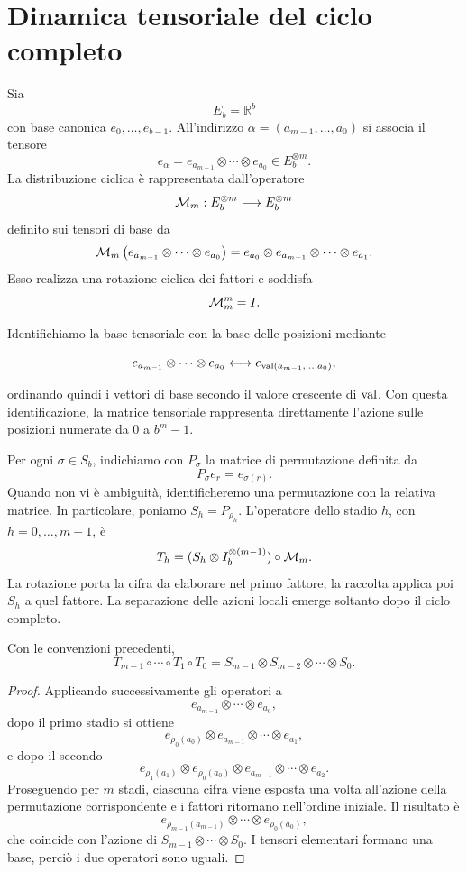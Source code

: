	\section{Dinamica tensoriale del ciclo completo}

	Sia
	\[
	E_b=\mathbb R^b
	\]
	con base canonica \(e_0,\dots,e_{b-1}\). All'indirizzo
	\(\alpha=(a_{m-1},\dots,a_0)\) si associa il tensore
	\[
	e_\alpha
	=
	e_{a_{m-1}}\otimes\cdots\otimes e_{a_0}
	\in E_b^{\otimes m}.
	\]
	La distribuzione ciclica è rappresentata dall'operatore
	\[
	\mathcal M_m:E_b^{\otimes m}\longrightarrow E_b^{\otimes m}
	\]
	definito sui tensori di base da
	\[
	\mathcal M_m
	\left(
	e_{a_{m-1}}\otimes\cdots\otimes e_{a_0}
	\right)
	=
	e_{a_0}\otimes e_{a_{m-1}}\otimes\cdots\otimes e_{a_1}.
	\]
	Esso realizza una rotazione ciclica dei fattori e soddisfa
	\[
	\mathcal M_m^m=I.
	\]

	Identifichiamo la base tensoriale con la base delle posizioni mediante

	\[
	 e_{a_{m-1}}\otimes\cdots\otimes e_{a_0}
	 \longleftrightarrow
	 e_{\operatorname{val}(a_{m-1},\dots,a_0)},
	\]

	ordinando quindi i vettori di base secondo il valore crescente di \(\operatorname{val}\). Con questa identificazione, la matrice tensoriale rappresenta direttamente l'azione sulle posizioni numerate da \(0\) a \(b^m-1\).

	Per ogni \(\sigma\in S_b\), indichiamo con \(P_\sigma\) la matrice di
	permutazione definita da
	\[
	P_\sigma e_r=e_{\sigma(r)}.
	\]
	Quando non vi è ambiguità, identificheremo una permutazione con la relativa
	matrice. In particolare, poniamo \(S_h=P_{\rho_h}\).
	L'operatore dello stadio \(h\), con \(h=0,\dots,m-1\), è
	\[
	T_h
	=
	(S_h\otimes I_b^{\otimes(m-1)})\circ\mathcal M_m.
	\]
	La rotazione porta la cifra da elaborare nel primo fattore; la raccolta
	applica poi \(S_h\) a quel fattore. La separazione delle azioni locali emerge
	soltanto dopo il ciclo completo.

	\begin{theorem}
		Con le convenzioni precedenti,
		\[
		T_{m-1}\circ\cdots\circ T_1\circ T_0
		=
		S_{m-1}\otimes S_{m-2}\otimes\cdots\otimes S_0.
		\]
	\end{theorem}

	\begin{proof}
		Applicando successivamente gli operatori a
		\[
		e_{a_{m-1}}\otimes\cdots\otimes e_{a_0},
		\]
		dopo il primo stadio si ottiene
		\[
		e_{\rho_0(a_0)}\otimes e_{a_{m-1}}\otimes\cdots\otimes e_{a_1},
		\]
		e dopo il secondo
		\[
		e_{\rho_1(a_1)}\otimes e_{\rho_0(a_0)}
		\otimes e_{a_{m-1}}\otimes\cdots\otimes e_{a_2}.
		\]
		Proseguendo per \(m\) stadi, ciascuna cifra viene esposta una volta
		all'azione della permutazione corrispondente e i fattori ritornano
		nell'ordine iniziale. Il risultato è
		\[
		e_{\rho_{m-1}(a_{m-1})}
		\otimes\cdots\otimes
		e_{\rho_0(a_0)},
		\]
		che coincide con l'azione di
		\(S_{m-1}\otimes\cdots\otimes S_0\). I tensori elementari formano una base,
		perciò i due operatori sono uguali.
	\end{proof}

